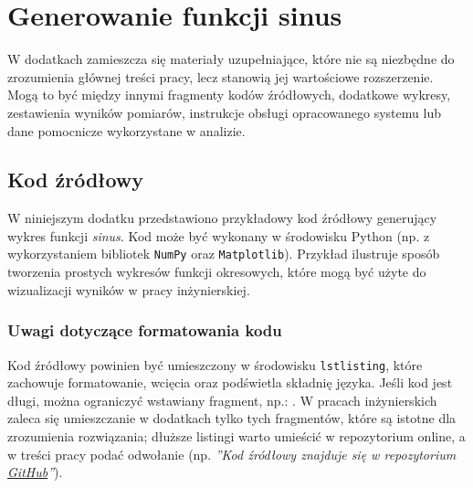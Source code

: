 \chapter{Generowanie funkcji sinus}\label{page:A_appendix}
W dodatkach zamieszcza się materiały uzupełniające, które nie są niezbędne do zrozumienia głównej treści pracy, lecz stanowią jej wartościowe rozszerzenie. Mogą to być między innymi fragmenty kodów źródłowych, dodatkowe wykresy, zestawienia wyników pomiarów, instrukcje obsługi opracowanego systemu lub dane pomocnicze wykorzystane w analizie.

\section{Kod źródłowy}
W niniejszym dodatku przedstawiono przykładowy kod źródłowy generujący wykres funkcji \emph{sinus}. Kod może być wykonany w środowisku Python (np. z wykorzystaniem bibliotek \texttt{NumPy} \cite{NumPyGuide2025} oraz \texttt{Matplotlib}). Przykład ilustruje sposób tworzenia prostych wykresów funkcji okresowych, które mogą być użyte do wizualizacji wyników w pracy inżynierskiej.

\begin{center}
  
\end{center}

\subsection{Uwagi dotyczące formatowania kodu}
Kod źródłowy powinien być umieszczony w środowisku \texttt{lstlisting}, które zachowuje formatowanie, wcięcia oraz podświetla składnię języka. Jeśli kod jest długi, można ograniczyć wstawiany fragment, np.: \verb||. W pracach inżynierskich zaleca się umieszczanie w dodatkach tylko tych fragmentów, które są istotne dla zrozumienia rozwiązania;  dłuższe listingi warto umieścić w repozytorium online, a w treści pracy podać odwołanie (np. \emph{''Kod źródłowy znajduje się w repozytorium \href{https://github.com}{GitHub}''}).
